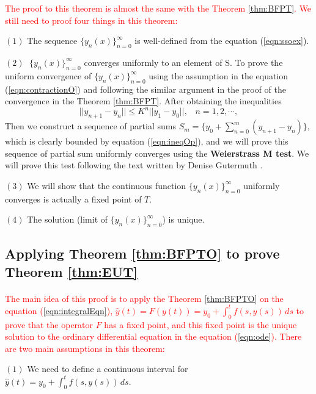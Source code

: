 \documentclass{article}
\theoremstyle{definition}
\theoremstyle{remark}
\begin{document}
\textcolor{red}{The proof to this theorem is almost the same with the Theorem \ref{thm:BFPT}. We still need to proof four things in this theorem: }

$(1)$ The sequence $\{y_n(x)\}_{n=0}^{\infty}$ is well-defined from the equation (\ref{eqn:ssoex}). 

$(2) \;$ $\{y_n(x)\}_{n=0}^{\infty}$ converges uniformly to an element of S. To prove the uniform convergence of $\{y_n(x)\}_{n=0}^{\infty}$ using the assumption in the equation (\ref{eqn:contractionO}) and following the similar argument in the proof of the convergence in the Theorem \ref{thm:BFPT}. After obtaining the inequalities
\begin{equation}\label{eqn:ineqOp}
    \lvert\lvert y_{n+1} - y_{n} \rvert\rvert \leq K^{n}\lvert\lvert y_1 - y_0 \rvert\rvert, \; \; \; n = 1,2, \cdots,
\end{equation}
Then we construct a sequence of partial sums $S_m = \{y_0 + \sum_{n = 0}^{m}{(y_{n+1} - y_n)}\}$, which is clearly bounded by equation (\ref{eqn:ineqOp}), and we will prove this sequence of partial sum uniformly converges using the \textbf{Weierstrass M test}. We will prove this test following the text written by Denise Gutermuth \cite{gutermuth_picards_nodate}. 

$(3)$ We will show that the continuous function $\{y_n(x)\}_{n=0}^{\infty}$ uniformly converges is actually a fixed point of $T$.

$(4)$ The solution (limit of $\{y_n(x)\}_{n=0}^{\infty}$) is unique.

\subsection{Applying Theorem \ref{thm:BFPTO} to prove Theorem \ref{thm:EUT}}

\paragraph{  }

\textcolor{red}{The main idea of this proof is to apply the Theorem \ref{thm:BFPTO} on the equation (\ref{eqn:integralEqn}), $\hat{y}(t) = F(y(t)) = y_0 + \int_{0}^{t}{f(s,y(s))}\,ds$ to prove that the operator $F$ has a fixed point, and this fixed point is the unique solution to the ordinary differential equation in the equation (\ref{eqn:ode}). There are two main assumptions in this theorem: }

$(1)$ We need to define a continuous interval for $\hat{y}(t) = y_0 + \int_{0}^{t}{f(s,y(s))}\,ds$.
\end{document}
